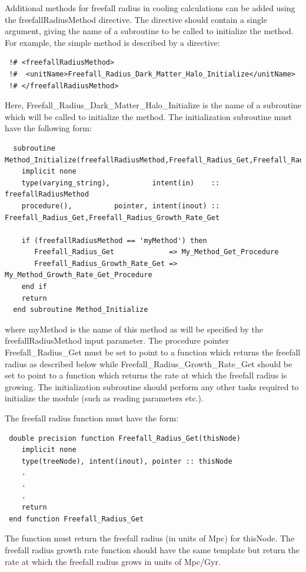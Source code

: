 Additional methods for freefall radius in cooling calculations can be added using the {\normalfont \ttfamily freefallRadiusMethod} directive. The directive should contain a single argument, giving the name of a subroutine to be called to initialize the method. For example, the {\normalfont \ttfamily simple} method is described by a directive:
\begin{verbatim}
 !# <freefallRadiusMethod>
 !#  <unitName>Freefall_Radius_Dark_Matter_Halo_Initialize</unitName>
 !# </freefallRadiusMethod>
\end{verbatim}
Here, {\normalfont \ttfamily Freefall\_Radius\_Dark\_Matter\_Halo\_Initialize} is the name of a subroutine which will be called to initialize the method. The initialization subroutine must have the following form:
\begin{verbatim}
  subroutine Method_Initialize(freefallRadiusMethod,Freefall_Radius_Get,Freefall_Radius_Growth_Rate_Get)
    implicit none
    type(varying_string),          intent(in)    :: freefallRadiusMethod
    procedure(),          pointer, intent(inout) :: Freefall_Radius_Get,Freefall_Radius_Growth_Rate_Get
    
    if (freefallRadiusMethod == 'myMethod') then
       Freefall_Radius_Get             => My_Method_Get_Procedure
       Freefall_Radius_Growth_Rate_Get => My_Method_Growth_Rate_Get_Procedure
    end if
    return
  end subroutine Method_Initialize
\end{verbatim}
where {\normalfont \ttfamily myMethod} is the name of this method as will be specified by the {\normalfont \ttfamily freefallRadiusMethod} input parameter. The procedure pointer {\normalfont \ttfamily Freefall\_Radius\_Get} must be set to point to a function which returns the freefall radius as described below while {\normalfont \ttfamily Freefall\_Radius\_Growth\_Rate\_Get} should be set to point to a function which returns the rate at which the freefall radius is growing. The initialization subroutine should perform any other tasks required to initialize the module (such as reading parameters etc.).

The freefall radius function must have the form:
\begin{verbatim}
 double precision function Freefall_Radius_Get(thisNode)
    implicit none
    type(treeNode), intent(inout), pointer :: thisNode
    .
    .
    .
    return
 end function Freefall_Radius_Get
\end{verbatim}
The function must return the freefall radius (in units of Mpc) for {\normalfont \ttfamily thisNode}. The freefall radius growth rate function should have the same template but return the rate at which the freefall radius grows in units of Mpc/Gyr.

